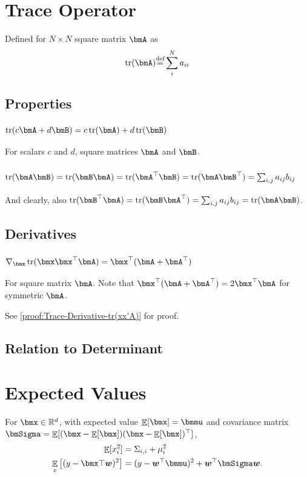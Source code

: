 \documentclass[11pt]{article}
\def\R{{\mathbb{R}}}
\DeclareMathOperator{\E}{\mathbb{E}}
\def\Def{{\stackrel{\text{def}}{=}}}
\DeclareMathOperator{\Trace}{tr}
\begin{document}
\section{Trace Operator}
Defined for $N \times N$ square matrix $\bmA$ as
\begin{equation}
\Trace(\bmA) \Def \sum_{i}^{N} a_{ii}
\label{eq:Definition-Trace}
\end{equation}

\subsection{Properties}

\subsubsection{$\Trace(c\bmA + d\bmB) = c\Trace(\bmA) + d\Trace(\bmB)$}
For scalars $c$ and $d$, square matrices $\bmA$ and $\bmB$.

\subsubsection{$\Trace(\bmA\bmB) = \Trace(\bmB\bmA) = \Trace(\bmA^\top\bmB) = \Trace(\bmA\bmB^\top) = \sum_{i,j} a_{ij}b_{ij}$}
And clearly, also $\Trace(\bmB^\top\bmA) = \Trace(\bmB\bmA^\top) = \sum_{i,j} a_{ij}b_{ij} = \Trace(\bmA\bmB)$.

\subsection{Derivatives}

\subsubsection{$\nabla_{\bmx}\Trace(\bmx \bmx^\top \bmA) = \bmx^\top (\bmA + \bmA^\top)$}
\label{sec:Trace-Derivative-tr(xx'A)}
For square matrix $\bmA$.
Note that $\bmx^\top (\bmA + \bmA^\top) = 2\bmx^\top \bmA$ for symmetric $\bmA$.

See \cref{proof:Trace-Derivative-tr(xx'A)} for proof.

\subsection{Relation to Determinant}


\section{Expected Values}
For $\bmx \in \R^d$, with expected value $\E[\bmx] = \bmmu$ and covariance matrix $ \bmSigma = \E[(\bmx - \E[\bmx]) (\bmx - \E[\bmx])^\top]$,
\begin{align}
\E[x_i^2] &= \Sigma_{i,i} + \mu_i^2
\\
\E_{x} \left[ (y - \bmx\top \bm{w})^2 \right]
&= (y - \bm{w}^\top \bmmu)^2 + \bm{w}^\top \bmSigma \bm{w}.
\end{align}
\end{document}

